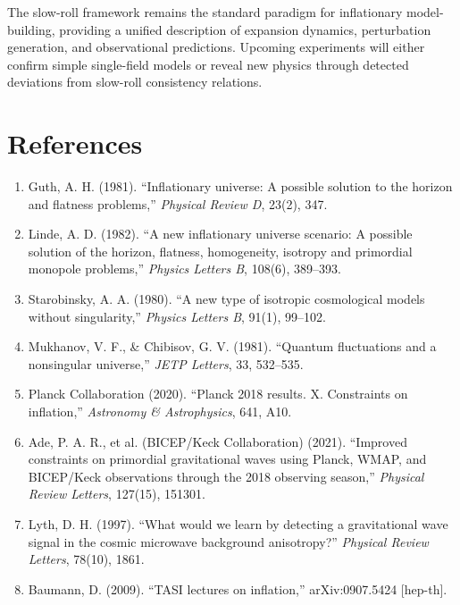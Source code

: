 \documentclass[a4paper, 11pt]{article}
\begin{document}
The slow-roll framework remains the standard paradigm for inflationary model-building, providing
a unified description of expansion dynamics, perturbation generation, and observational
predictions. Upcoming experiments will either confirm simple single-field models or reveal
new physics through detected deviations from slow-roll consistency relations.

\section*{References}

\begin{enumerate}
\item Guth, A. H. (1981). ``Inflationary universe: A possible solution to the horizon and
flatness problems,'' \textit{Physical Review D}, 23(2), 347.

\item Linde, A. D. (1982). ``A new inflationary universe scenario: A possible solution of
the horizon, flatness, homogeneity, isotropy and primordial monopole problems,''
\textit{Physics Letters B}, 108(6), 389--393.

\item Starobinsky, A. A. (1980). ``A new type of isotropic cosmological models without
singularity,'' \textit{Physics Letters B}, 91(1), 99--102.

\item Mukhanov, V. F., \& Chibisov, G. V. (1981). ``Quantum fluctuations and a nonsingular
universe,'' \textit{JETP Letters}, 33, 532--535.

\item Planck Collaboration (2020). ``Planck 2018 results. X. Constraints on inflation,''
\textit{Astronomy \& Astrophysics}, 641, A10.

\item Ade, P. A. R., et al. (BICEP/Keck Collaboration) (2021). ``Improved constraints on
primordial gravitational waves using Planck, WMAP, and BICEP/Keck observations through
the 2018 observing season,'' \textit{Physical Review Letters}, 127(15), 151301.

\item Lyth, D. H. (1997). ``What would we learn by detecting a gravitational wave signal
in the cosmic microwave background anisotropy?'' \textit{Physical Review Letters}, 78(10), 1861.

\item Baumann, D. (2009). ``TASI lectures on inflation,'' arXiv:0907.5424 [hep-th].


\end{enumerate}
\end{document}
